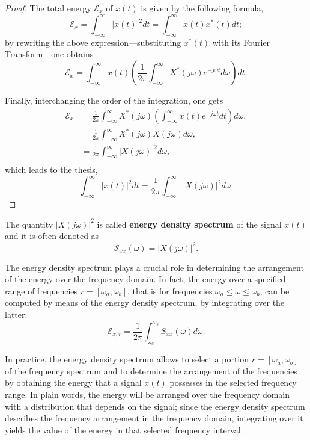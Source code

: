 \documentclass[\documentfontsize, twocolumn]{\classname}
\begin{document}
\begin{proof}
The total energy $\mathcal E_x$ of $x(t)$ is given by the following formula,
\[
    \mathcal E_x = \int_{-\infty}^\infty |x(t)|^2dt = \int_{-\infty}^\infty x(t)x^*(t)dt;
\]
by rewriting the above expression---substituting $x^*(t)$ with its Fourier Transform---one obtains
\[
    \mathcal E_x = \int_{-\infty}^\infty x(t)\left(\frac{1}{2\pi}\int_{-\infty}^\infty X^* (j\omega) e^{-j\omega t} d\omega \right) dt.
\]

Finally, interchanging the order of the integration, one gets
\begin{align*}
    \mathcal E_x &= \frac{1}{2\pi}\int_{-\infty}^\infty X^*(j\omega)\left(\int_{-\infty}^\infty x (t) e^{-j\omega t} dt \right) d\omega,\\
                 &= \frac{1}{2\pi}\int_{-\infty}^\infty X^*(j\omega)X(j\omega) d\omega,\\
                 &= \frac{1}{2\pi}\int_{-\infty}^\infty \left|X(j\omega)\right|^2 d\omega,\\
\end{align*}
which leads to the thesis,
\[
        \int_{-\infty}^\infty|x(t)|^2dt = \frac 1 {2\pi} \int_{-\infty}^\infty\left|X(j\omega)\right|^2 d\omega.
\]
\end{proof}

The quantity $\left|X(j\omega)\right|^2$ is called \textbf{energy density spectrum} of the signal $x(t)$ and it is often denoted as 
\begin{equation}\label{eqn:energyDensitySpectrum}
    \mathcal S_{xx}(\omega)=\left|X(j\omega)\right|^2.
\end{equation}

The energy density spectrum plays a crucial role in determining the arrangement of the energy over the frequency domain. In fact, the energy over a specified range of frequencies $r = [\omega_a, \omega_b]$, that is for frequencies $\omega_a \leq \omega \leq \omega_b$, can be computed by means of the energy density spectrum, by integrating over the latter:
\begin{equation}\label{eqn:energyDensitySpectrumComputation}
    \mathcal E_{x,r} = \frac 1 {2\pi} \int_{\omega_a}^{\omega_b} S_{xx}(\omega)d\omega.
\end{equation}

In practice, the energy density spectrum allows to select a portion $r = [\omega_a, \omega_b]$ of the frequency spectrum and to determine the arrangement of the frequencies by obtaining the energy that a signal $x(t)$ possesses in the selected frequency range. In plain words, the energy will be arranged over the frequency domain with a distribution that depends on the signal; since the energy density spectrum describes the frequency arrangement in the frequency domain, integrating over it yields the value of the energy in that selected frequency interval.
\end{document}
